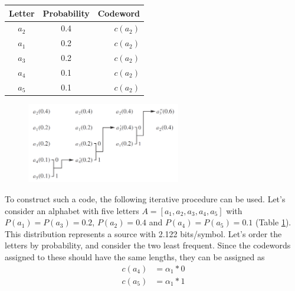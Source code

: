       \begin{table}
        \centering
        \begin{tabular}{ccr}
          \toprule
          Letter & Probability & Codeword \\
          \midrule
          $a_2$ & 0.4 & $c(a_2)$ \\
          $a_1$ & 0.2 & $c(a_2)$ \\
          $a_3$ & 0.2 & $c(a_2)$ \\
          $a_4$ & 0.1 & $c(a_2)$ \\
          $a_5$ & 0.1 & $c(a_2)$ \\
          \bottomrule
        \end{tabular}
        \label{tab:huffman1}
      \end{table}
  
      \begin{figure}
        \centering
        \includegraphics[width=0.6\textwidth]{huffman}
        \label{fig:huffman}
      \end{figure}
  
      To construct such a code, the following iterative procedure can be used. Let's consider an alphabet with five letters $A = [a_1,a_2,a_3,a_4,a_5]$ with $P(a_1)=P(a_3)=0.2$, $P(a_2)=0.4$ and $P(a_4)=P(a_5)=0.1$ (Table \ref{tab:huffman1}). This distribution represents a source with 2.122 bits/symbol. Let's order the letters by probability, and consider the two least frequent. Since the codewords assigned to these should have the same lengths, they can be assigned as
      \begin{align*}
        c(a_4) &= \alpha_1 * 0 \\
        c(a_5) &= \alpha_1 *1
      \end{align*}
  
